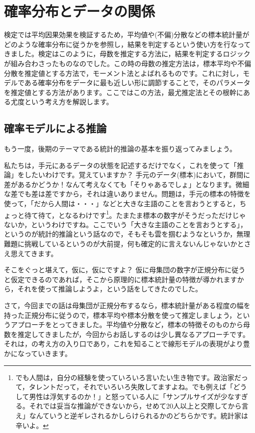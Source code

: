 \documentclass{ltjsarticle}
\begin{document}
\chapter{確率分布とデータの関係}
\label{chapter24}
検定では平均因果効果を検証するため，平均値や(不偏)分散などの標本統計量がどのような確率分布に従うかを参照し，結果を判定するという使い方を行なってきました。検定はこのように，母数を推定する方法に，結果を判定するロジックが組み合わさったものなのでした。この時の母数の推定方法は，標本平均や不偏分散を推定値とする方法で，モーメント法とよばれるものです。これに対し，モデルである確率分布をデータに最も近しい形に調節することで，そのパラメータを推定値とする方法があります。ここではこの方法，最尤推定法とその根幹にある尤度という考え方を解説します。
\section{確率モデルによる推論}
もう一度，後期のテーマである統計的推論の基本を振り返ってみましょう。

私たちは，手元にあるデータの状態を記述するだけでなく，これを使って「推論」をしたいわけです。覚えていますか？ 手元のデータ(標本)において，群間に差があるかどうか！なんて考えなくても「そりゃあるでしょ」となります。微細な差でも差は差ですから，それは違いありません。問題は，手元の標本の特徴を使って，「だから人間は・・・」などと大きな主語のことを言おうとすると，ちょっと待て待て，となるわけです\footnote{でも人間は，自分の経験を使っていろいろ言いたい生き物です。政治家だって，タレントだって，それでいろいろ失敗してますよね。でも例えば「どうして男性は浮気するのか！」と怒っている人に「サンプルサイズが少なすぎる。それでは妥当な推論ができないから，せめて20人以上と交際してから言え」なんていうと逆ギレされるかしらけられるかのどちらかです。統計家は辛いよ。}。たまたま標本の数字がそうだっただけじゃないか，というわけですね。ここでいう「大きな主語のことを言おうとする」，というのが統計的推論という話なので，そもそも雲を掴むようなというか，無理難題に挑戦しているというのが大前提，何も確定的に言えないんじゃないかとさえ思えてきます。

そこをぐっと堪えて，仮に，仮にですよ？ 仮に母集団の数字が正規分布に従うと仮定できるのであれば，そこから原理的に標本統計量の特徴が導かれますから，それを使って推論しようよ，という話をしてきたのでした。

さて，今回までの話は母集団が正規分布するなら，標本統計量がある程度の幅を持った正規分布に従うので，標本平均や標本分散を使って推定しましょう，というアプローチをとってきました。平均値や分散など，標本の特徴そのものから母数を推定してきましたが，今回からお話しするのは少し異なるアプローチです。それは，の考え方の入り口であり，これを知ることで線形モデルの表現がより豊かになっていきます。
\end{document}
